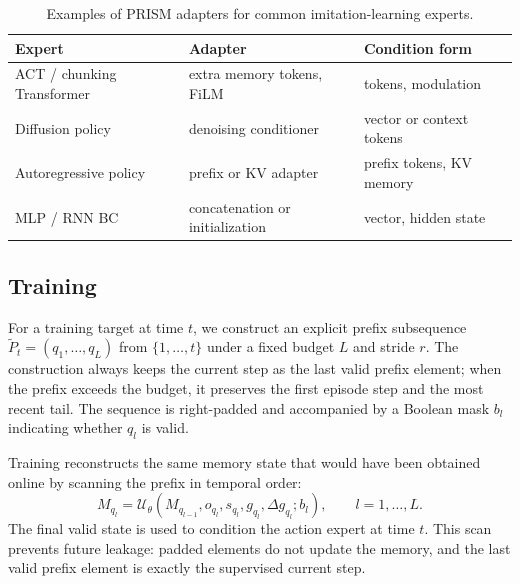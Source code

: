 \begin{table}[t]
    \centering
    \caption{Examples of PRISM adapters for common imitation-learning experts.}
    \label{tab:prism_adapters}
    \begin{tabular}{lll}
        \toprule
        Expert & Adapter & Condition form \\
        \midrule
        ACT / chunking Transformer & extra memory tokens, FiLM & tokens, modulation \\
        Diffusion policy & denoising conditioner & vector or context tokens \\
        Autoregressive policy & prefix or KV adapter & prefix tokens, KV memory \\
        MLP / RNN BC & concatenation or initialization & vector, hidden state \\
        \bottomrule
    \end{tabular}
\end{table}

\subsection{Training}
\label{sec:method_training}

For a training target at time $t$, we construct an explicit prefix subsequence
$\tilde P_t=(q_1,\ldots,q_L)$ from $\{1,\ldots,t\}$ under a fixed budget $L$ and
stride $r$. The construction always keeps the current step as the last valid
prefix element; when the prefix exceeds the budget, it preserves the first
episode step and the most recent tail. The sequence is right-padded and
accompanied by a Boolean mask $b_l$ indicating whether $q_l$ is valid.

Training reconstructs the same memory state that would have been obtained
online by scanning the prefix in temporal order:
\begin{equation}
    M_{q_l}
    =
    \mathcal{U}_{\theta}(M_{q_{l-1}},o_{q_l},s_{q_l},g_{q_l},\Delta g_{q_l}; b_l),
    \qquad l=1,\ldots,L.
    \label{eq:prefix_scan}
\end{equation}
The final valid state is used to condition the action expert at time $t$. This
scan prevents future leakage: padded elements do not update the memory, and the
last valid prefix element is exactly the supervised current step.

